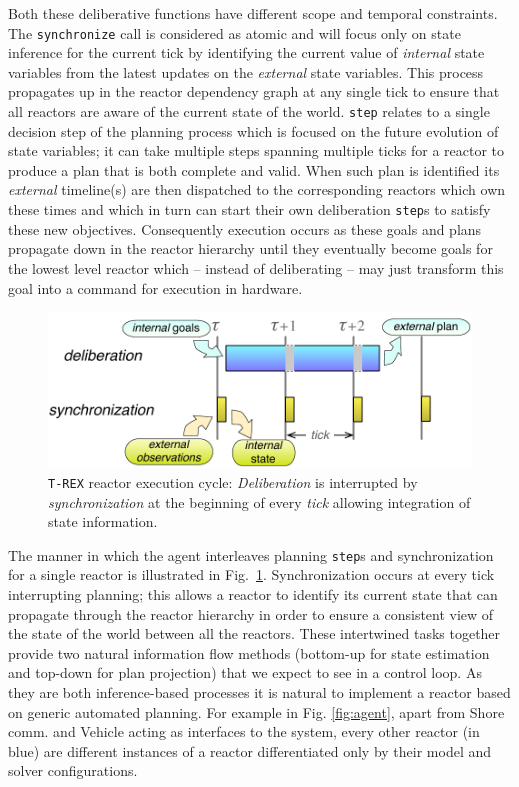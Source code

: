 Both these deliberative functions have different scope and temporal
constraints. The \texttt{synchronize} call is considered as atomic and
will focus only on state inference for the current tick by identifying
the current value of {\em internal} state variables from the latest
updates on the {\em external} state variables. This process propagates
up in the reactor dependency graph at any single tick  to ensure that all reactors are aware of
the current state of the world. \texttt{step} relates to a single
decision step of the planning process which is focused on the future
evolution of state variables; it can take multiple steps spanning
multiple ticks for a reactor to produce a plan that is both complete
and valid. When such plan is identified  its {\em external} timeline(s) are then
dispatched to the corresponding reactors which own these times and
which in turn can start their own deliberation \texttt{step}s to
satisfy these new objectives. Consequently execution occurs as these
goals and plans propagate down in the reactor hierarchy until they
eventually become goals for the lowest level reactor which -- instead
of deliberating -- may just transform this goal into a command for
execution in hardware.

\begin{figure}[!htbp]
  \centering
  \vskip-1pc
  \includegraphics[width=0.55\columnwidth]{figs/tick-cycle}
  \caption{\small \texttt{T-REX} reactor execution cycle: {\em
      Deliberation} is interrupted by {\em synchronization} at the
    beginning of every {\em tick} allowing integration of state
    information.}
  \label{fig:tick-exec}
  \vskip-0.8pc
\end{figure}

The manner in which the agent interleaves planning \texttt{step}s and
synchronization for a single reactor is illustrated in
Fig.~\ref{fig:tick-exec}. Synchronization occurs at every tick
interrupting planning; this allows a reactor to identify its current
state that can propagate through the reactor hierarchy in order to
ensure a consistent view of the state of the world between all the
reactors.
These intertwined tasks together provide two natural information flow
methods (bottom-up for state estimation and top-down for plan
projection) that we expect to see in a control loop. As they are both
inference-based processes it is natural to implement a reactor based
on generic automated planning. For example in Fig. \ref{fig:agent},
apart from \textsf{Shore comm.} and \textsf{Vehicle} acting as
interfaces to the system, every other reactor (in blue) are different
instances of a \eu reactor differentiated only by their model and \eu
solver configurations.

